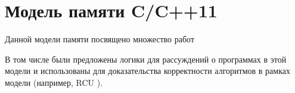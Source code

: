 \section{Модель памяти C/C++11}

Данной модели памяти посвящено множество работ
\cite{Batty-al:POPL12,Batty-al:POPL13,Lahav-al:PLDI17,Chakraborty-Vafeiadis:CGO16,Vafeiadis-al:POPL15,Vafeiadis:CPP15}

В том числе были предложены логики для рассуждений о программах в этой модели
\cite{Turon-al:OOPSLA14,Vafeiadis-Narayan:OOPSLA13,Lahav-Vafeiadis:ICALP15,Doko-Vafeiadis:VMCAI16}
и использованы для доказательства корректности
алгоритмов в рамках модели (например, RCU \cite{Tassarotti-al:PLDI15,Doko-Vafeiadis:ESOP17}).


